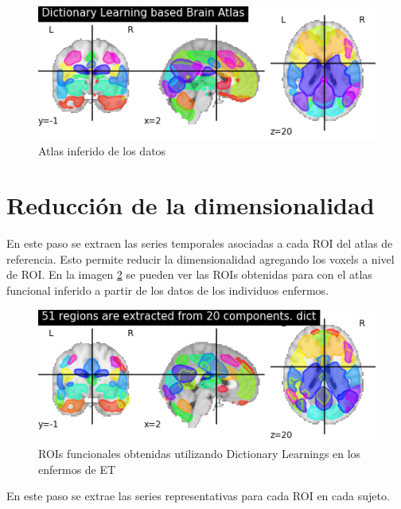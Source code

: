 \begin{figure}[H]
	\includegraphics[width=\linewidth, height=\textheight, keepaspectratio]{img/conectividad/dic_prob_atlas_et.png}
	\caption{Atlas inferido de los datos}
	\label{preproc:data_atlas}
\end{figure} 
  
\section{Reducción de la dimensionalidad}

En este paso se extraen las series temporales asociadas a cada ROI del atlas de referencia. Esto permite reducir la dimensionalidad agregando los voxels a nivel de ROI. En la imagen \ref{metod:rois} se pueden ver las ROIs obtenidas para con el atlas funcional inferido a partir de los datos de los individuos enfermos.

\begin{figure}[H]
	\includegraphics[width=\linewidth, height=\textheight, keepaspectratio]{img/conectividad/dic_rois_et.png}
	\caption{ROIs funcionales obtenidas utilizando Dictionary Learnings en los enfermos de ET}	\label{metod:rois}
\end{figure}

En este paso se extrae las series representativas para cada ROI en cada sujeto.\cite{regions}

